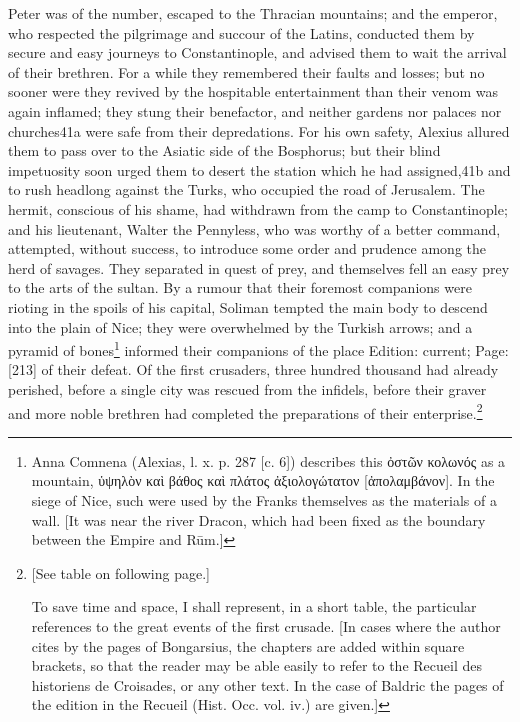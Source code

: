 Peter was of the number, escaped to the Thracian mountains; and the emperor, who respected the pilgrimage and succour of the Latins, conducted them by secure and easy journeys to Constantinople, and advised them to wait the arrival of their brethren. For a while they remembered their faults and losses; but no sooner were they revived by the hospitable entertainment than their venom was again inflamed; they stung their benefactor, and neither gardens nor palaces nor churches41a were safe from their depredations. For his own safety, Alexius allured them to pass over to the Asiatic side of the Bosphorus; but their blind impetuosity soon urged them to desert the station which he had assigned,41b and to rush headlong against the Turks, who occupied the road of Jerusalem. The hermit, conscious of his shame, had withdrawn from the camp to Constantinople; and his lieutenant, Walter the Pennyless, who was worthy of a better command, attempted, without success, to introduce some order and prudence among the herd of savages. They separated in quest of prey, and themselves fell an easy prey to the arts of the sultan. By a rumour that their foremost companions were rioting in the spoils of his capital, Soliman tempted the main body to descend into the plain of Nice; they were overwhelmed by the Turkish arrows; and a pyramid of bones\footnote{Anna Comnena (Alexias, l. x. p. 287 [c. 6]) describes this \textgreek{\texthebrew{ὀ}στ\texthebrew{ῶ}ν κολωνός} as a mountain, \textgreek{\texthebrew{ὑ}ψηλ\texthebrew{ὸ}ν κα\texthebrew{ὶ} βάθος κα\texthebrew{ὶ} πλάτος \texthebrew{ἀ}ξιολογώτατον} [\textgreek{\texthebrew{ἀ}πολαμβάνον}]. In the siege of Nice, such were used by the Franks themselves as the materials of a wall. [It was near the river Dracon, which had been fixed as the boundary between the Empire and Rūm.]} informed their companions of the place Edition: current; Page: [213] of their defeat. Of the first crusaders, three hundred thousand had already perished, before a single city was rescued from the infidels, before their graver and more noble brethren had completed the preparations of their enterprise.\footnote{[See table on following page.]

To save time and space, I shall represent, in a short table, the particular references to the great events of the first crusade. [In cases where the author cites by the pages of Bongarsius, the chapters are added within square brackets, so that the reader may be able easily to refer to the Recueil des historiens de Croisades, or any other text. In the case of Baldric the pages of the edition in the Recueil (Hist. Occ. vol. iv.) are given.]

}
